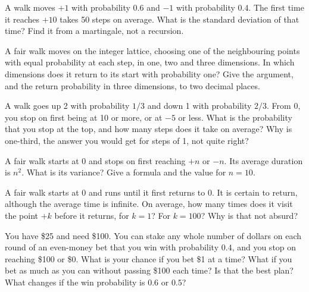 \begin{question}\label{iq:iv1:random-walks-and-martingales:20}
A walk moves $+1$ with probability $0.6$ and $-1$ with probability $0.4$. The first time it reaches $+10$ takes 50 steps on average. What is the standard deviation of that time? Find it from a martingale, not a recursion.
\end{question}

\begin{question}\label{iq:iv1:random-walks-and-martingales:21}
A fair walk moves on the integer lattice, choosing one of the neighbouring points with equal probability at each step, in one, two and three dimensions. In which dimensions does it return to its start with probability one? Give the argument, and the return probability in three dimensions, to two decimal places.
\end{question}

\begin{question}\label{iq:iv1:random-walks-and-martingales:22}
A walk goes up 2 with probability $1/3$ and down 1 with probability $2/3$. From 0, you stop on first being at 10 or more, or at $-5$ or less. What is the probability that you stop at the top, and how many steps does it take on average? Why is one-third, the answer you would get for steps of 1, not quite right?
\end{question}

\begin{question}\label{iq:iv1:random-walks-and-martingales:23}
A fair walk starts at 0 and stops on first reaching $+n$ or $-n$. Its average duration is $n^2$. What is its variance? Give a formula and the value for $n = 10$.
\end{question}

\begin{question}\label{iq:iv1:random-walks-and-martingales:24}
A fair walk starts at 0 and runs until it first returns to 0. It is certain to return, although the average time is infinite. On average, how many times does it visit the point $+k$ before it returns, for $k = 1$? For $k = 100$? Why is that not absurd?
\end{question}

\begin{question}\label{iq:iv1:random-walks-and-martingales:25}
You have \$25 and need \$100. You can stake any whole number of dollars on each round of an even-money bet that you win with probability $0.4$, and you stop on reaching \$100 or \$0. What is your chance if you bet \$1 at a time? What if you bet as much as you can without passing \$100 each time? Is that the best plan? What changes if the win probability is $0.6$ or $0.5$?
\end{question}
